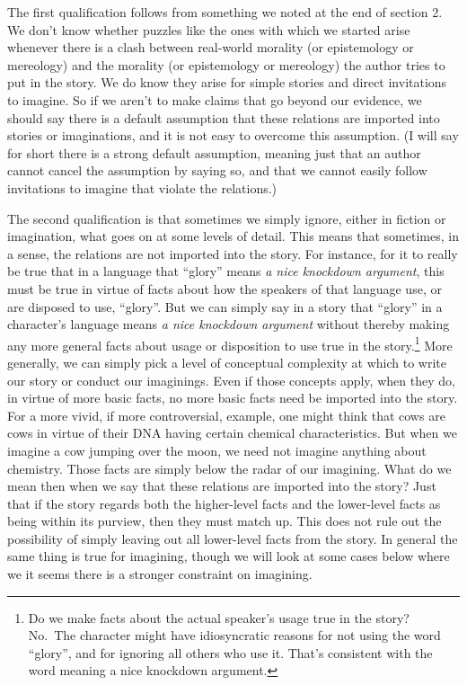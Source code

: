 \documentclass[
  11pt,
  letterpaper,
  DIV=11,
  numbers=noendperiod,
  twoside]{scrartcl}
\begin{document}
The first qualification follows from something we noted at the end of
section 2. We don't know whether puzzles like the ones with which we
started arise whenever there is a clash between real-world morality (or
epistemology or mereology) and the morality (or epistemology or
mereology) the author tries to put in the story. We do know they arise
for simple stories and direct invitations to imagine. So if we aren't to
make claims that go beyond our evidence, we should say there is a
default assumption that these relations are imported into stories or
imaginations, and it is not easy to overcome this assumption. (I will
say for short there is a strong default assumption, meaning just that an
author cannot cancel the assumption by saying so, and that we cannot
easily follow invitations to imagine that violate the relations.)

The second qualification is that sometimes we simply ignore, either in
fiction or imagination, what goes on at some levels of detail. This
means that sometimes, in a sense, the relations are not imported into
the story. For instance, for it to really be true that in a language
that ``glory'' means \emph{a nice knockdown argument}, this must be true
in virtue of facts about how the speakers of that language use, or are
disposed to use, ``glory''. But we can simply say in a story that
``glory'' in a character's language means \emph{a nice knockdown
argument} without thereby making any more general facts about usage or
disposition to use true in the story.\footnote{Do we make facts about
  the actual speaker's usage true in the story? No.~The character might
  have idiosyncratic reasons for not using the word ``glory'', and for
  ignoring all others who use it. That's consistent with the word
  meaning a nice knockdown argument.} More generally, we can simply pick
a level of conceptual complexity at which to write our story or conduct
our imaginings. Even if those concepts apply, when they do, in virtue of
more basic facts, no more basic facts need be imported into the story.
For a more vivid, if more controversial, example, one might think that
cows are cows in virtue of their DNA having certain chemical
characteristics. But when we imagine a cow jumping over the moon, we
need not imagine anything about chemistry. Those facts are simply below
the radar of our imagining. What do we mean then when we say that these
relations are imported into the story? Just that if the story regards
both the higher-level facts and the lower-level facts as being within
its purview, then they must match up. This does not rule out the
possibility of simply leaving out all lower-level facts from the story.
In general the same thing is true for imagining, though we will look at
some cases below where we it seems there is a stronger constraint on
imagining.
\end{document}
